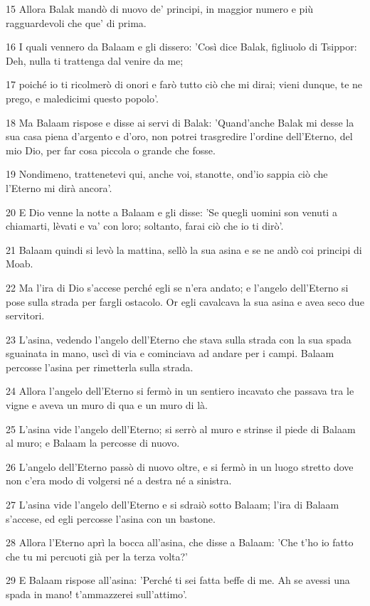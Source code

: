 \par 15 Allora Balak mandò di nuovo de' principi, in maggior numero e più ragguardevoli che que' di prima.
\par 16 I quali vennero da Balaam e gli dissero: 'Così dice Balak, figliuolo di Tsippor: Deh, nulla ti trattenga dal venire da me;
\par 17 poiché io ti ricolmerò di onori e farò tutto ciò che mi dirai; vieni dunque, te ne prego, e maledicimi questo popolo'.
\par 18 Ma Balaam rispose e disse ai servi di Balak: 'Quand'anche Balak mi desse la sua casa piena d'argento e d'oro, non potrei trasgredire l'ordine dell'Eterno, del mio Dio, per far cosa piccola o grande che fosse.
\par 19 Nondimeno, trattenetevi qui, anche voi, stanotte, ond'io sappia ciò che l'Eterno mi dirà ancora'.
\par 20 E Dio venne la notte a Balaam e gli disse: 'Se quegli uomini son venuti a chiamarti, lèvati e va' con loro; soltanto, farai ciò che io ti dirò'.
\par 21 Balaam quindi si levò la mattina, sellò la sua asina e se ne andò coi principi di Moab.
\par 22 Ma l'ira di Dio s'accese perché egli se n'era andato; e l'angelo dell'Eterno si pose sulla strada per fargli ostacolo. Or egli cavalcava la sua asina e avea seco due servitori.
\par 23 L'asina, vedendo l'angelo dell'Eterno che stava sulla strada con la sua spada sguainata in mano, uscì di via e cominciava ad andare per i campi. Balaam percosse l'asina per rimetterla sulla strada.
\par 24 Allora l'angelo dell'Eterno si fermò in un sentiero incavato che passava tra le vigne e aveva un muro di qua e un muro di là.
\par 25 L'asina vide l'angelo dell'Eterno; si serrò al muro e strinse il piede di Balaam al muro; e Balaam la percosse di nuovo.
\par 26 L'angelo dell'Eterno passò di nuovo oltre, e si fermò in un luogo stretto dove non c'era modo di volgersi né a destra né a sinistra.
\par 27 L'asina vide l'angelo dell'Eterno e si sdraiò sotto Balaam; l'ira di Balaam s'accese, ed egli percosse l'asina con un bastone.
\par 28 Allora l'Eterno aprì la bocca all'asina, che disse a Balaam: 'Che t'ho io fatto che tu mi percuoti già per la terza volta?'
\par 29 E Balaam rispose all'asina: 'Perché ti sei fatta beffe di me. Ah se avessi una spada in mano! t'ammazzerei sull'attimo'.
